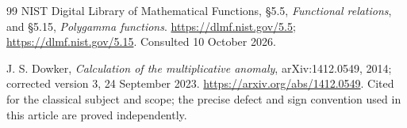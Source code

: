 \begin{thebibliography}{99}
NIST Digital Library of Mathematical Functions, \S5.5,
\emph{Functional relations}, and \S5.15, \emph{Polygamma functions}.
\url{https://dlmf.nist.gov/5.5}; \url{https://dlmf.nist.gov/5.15}.
Consulted 10 October 2026.

J. S. Dowker, \emph{Calculation of the multiplicative anomaly},
arXiv:1412.0549, 2014; corrected version 3, 24 September 2023.
\url{https://arxiv.org/abs/1412.0549}.
Cited for the classical subject and scope; the precise defect and sign
convention used in this article are proved independently.
\end{thebibliography}
